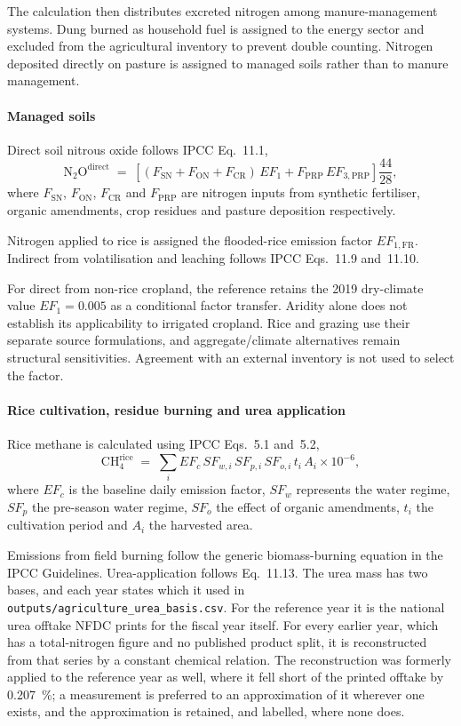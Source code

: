 The calculation then distributes excreted nitrogen among manure-management systems. Dung
burned as household fuel is assigned to the energy sector and excluded from the agricultural
inventory to prevent double counting. Nitrogen deposited directly on pasture is assigned to
managed soils rather than to manure management.

\paragraph{Managed soils}
Direct soil nitrous oxide follows IPCC Eq.~11.1,
\begin{equation}
\mathrm{N_2O^{direct}} \;=\;
\left[(F_{\mathrm{SN}}+F_{\mathrm{ON}}+F_{\mathrm{CR}})\,EF_1
+ F_{\mathrm{PRP}}\,EF_{3,\mathrm{PRP}}\right]\frac{44}{28},
\end{equation}
where $F_{\mathrm{SN}}$, $F_{\mathrm{ON}}$, $F_{\mathrm{CR}}$ and $F_{\mathrm{PRP}}$ are
nitrogen inputs from synthetic fertiliser, organic amendments, crop residues and pasture
deposition respectively.

Nitrogen applied to rice is assigned the flooded-rice emission factor
$EF_{1,\mathrm{FR}}$. Indirect \NtwoO{} from volatilisation and leaching follows IPCC
Eqs.~11.9 and~11.10.

For direct \NtwoO{} from non-rice cropland, the reference retains the 2019 dry-climate value $EF_1=0.005$ as a conditional factor transfer. Aridity alone does not establish its applicability to irrigated cropland. Rice and grazing use their separate source formulations, and aggregate/climate alternatives remain structural sensitivities. Agreement with an external inventory is not used to select the factor.

\paragraph{Rice cultivation, residue burning and urea application}
Rice methane is calculated using IPCC Eqs.~5.1 and~5.2,
\begin{equation}
\mathrm{CH_4^{rice}} \;=\; \sum_i EF_c\, SF_{w,i}\, SF_{p,i}\, SF_{o,i}\, t_i\, A_i
\times 10^{-6},
\end{equation}
where $EF_c$ is the baseline daily emission factor, $SF_w$ represents the water regime,
$SF_p$ the pre-season water regime, $SF_o$ the effect of organic amendments, $t_i$ the
cultivation period and $A_i$ the harvested area.

Emissions from field burning follow the generic biomass-burning equation in the IPCC
Guidelines. Urea-application \COtwo{} follows Eq.~11.13. The urea mass has two bases, and
each year states which it used in \texttt{outputs/agriculture\_urea\_basis.csv}. For the
reference year it is the national urea offtake NFDC prints for the fiscal year itself. For
every earlier year, which has a total-nitrogen figure and no published product split, it is
reconstructed from that series by a constant chemical relation. The reconstruction was
formerly applied to the reference year as well, where it fell short of the printed offtake by
\SI{0.207}{\percent}; a measurement is preferred to an approximation of it wherever one
exists, and the approximation is retained, and labelled, where none does.

